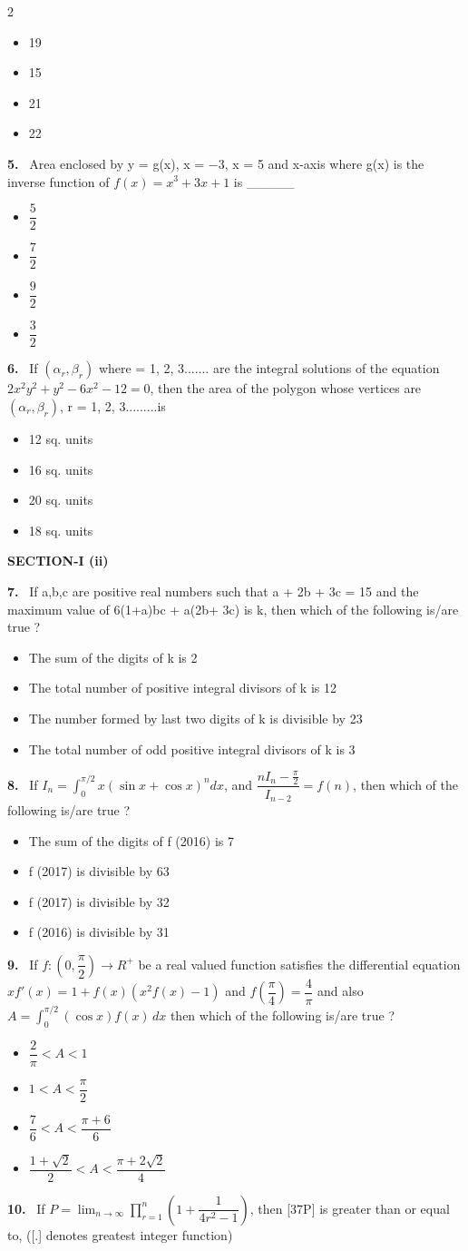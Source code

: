 \documentclass[10pt]{extarticle}
\newcommand{\sect}[1]{\par\smallskip\noindent\textbf{#1}\par}
\newcommand{\qn}[1]{\par\smallskip\noindent\textbf{#1.}~}
\newenvironment{qoptions}{\begin{itemize}[leftmargin=1.8em,itemsep=1pt,topsep=2pt,label={}]}{\end{itemize}}
\newcommand{\opt}[2]{\item[(#1)] #2}
\begin{document}
\begin{multicols}{2}
\begin{qoptions}
\opt{A}{19}
\opt{B}{15}
\opt{C}{21}
\opt{D}{22}
\end{qoptions}
\qn{5} Area enclosed by y = g(x), x = $-3$, x = 5 and x-axis where g(x) is the inverse function of $f(x)=x^3+3x+1$ is \_\_\_\_\_
\begin{qoptions}
\opt{A}{$\dfrac52$}
\opt{B}{$\dfrac72$}
\opt{C}{$\dfrac92$}
\opt{D}{$\dfrac32$}
\end{qoptions}
\qn{6} If $(\alpha_r,\beta_r)$ where = 1, 2, 3....... are the integral solutions of the equation $2x^2y^2+y^2-6x^2-12=0$, then the area of the polygon whose vertices are $(\alpha_r,\beta_r)$, r = 1, 2, 3.........is
\begin{qoptions}
\opt{A}{12 sq. units}
\opt{B}{16 sq. units}
\opt{C}{20 sq. units}
\opt{D}{18 sq. units}
\end{qoptions}
\sect{SECTION-I (ii)}
\qn{7} If a,b,c are positive real numbers such that a + 2b + 3c = 15 and the maximum value of 6(1+a)bc + a(2b+ 3c) is k, then which of the following is/are true ?
\begin{qoptions}
\opt{A}{The sum of the digits of k is 2}
\opt{B}{The total number of positive integral divisors of k is 12}
\opt{C}{The number formed by last two digits of k is divisible by 23}
\opt{D}{The total number of odd positive integral divisors of k is 3}
\end{qoptions}
\qn{8} If $I_n=\displaystyle\int_0^{\pi/2}x(\sin x+\cos x)^n dx$, and $\dfrac{nI_n-\frac\pi2}{I_{n-2}}=f(n)$, then which of the following is/are true ?
\begin{qoptions}
\opt{A}{The sum of the digits of f (2016) is 7}
\opt{B}{f (2017) is divisible by 63}
\opt{C}{f (2017) is divisible by 32}
\opt{D}{f (2016) is divisible by 31}
\end{qoptions}
\qn{9} If $f:\left(0,\dfrac\pi2\right)\to R^{+}$ be a real valued function satisfies the differential equation $xf'(x)=1+f(x)\left(x^2f(x)-1\right)$ and $f\left(\dfrac\pi4\right)=\dfrac4\pi$ and also $A=\displaystyle\int_0^{\pi/2}(\cos x)f(x)\,dx$ then which of the following is/are true ?
\begin{qoptions}
\opt{A}{$\dfrac2\pi<A<1$}
\opt{B}{$1<A<\dfrac\pi2$}
\opt{C}{$\dfrac76<A<\dfrac{\pi+6}{6}$}
\opt{D}{$\dfrac{1+\sqrt2}{2}<A<\dfrac{\pi+2\sqrt2}{4}$}
\end{qoptions}
\qn{10} If $P=\displaystyle\lim_{n\to\infty}\prod_{r=1}^{n}\left(1+\dfrac1{4r^2-1}\right)$, then [37P] is greater than or equal to, ([.] denotes greatest integer function)
\begin{qoptions}

\end{qoptions}
\end{multicols}
\end{document}
